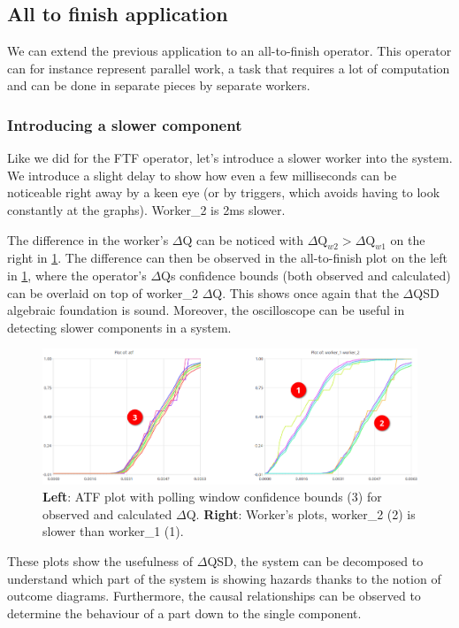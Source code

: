\subsection{All to finish application}
    We can extend the previous application to an all-to-finish operator. This operator can for instance represent parallel work, a task that requires a lot of computation and can be done in separate pieces by separate workers. \cite{dq-tut}

        \subsubsection{Introducing a slower component}
            Like we did for the FTF operator, let's introduce a slower worker into the system. We introduce a slight delay to show how even a few milliseconds can be noticeable right away by a keen eye (or by triggers, which avoids having to look constantly at the graphs). Worker\_2 is 2ms slower.
 
            The difference in the worker's $\Delta$Q can be noticed with $\Delta \text{Q}_{w2} > \Delta \text{Q}_{w1}$ on the right in \cref{fig:slower_atf}. The difference can then be observed in the all-to-finish plot on the left in \cref{fig:slower_atf}, where the operator's $\Delta$Qs confidence bounds (both observed and calculated) can be overlaid on top of worker\_2 $\Delta$Q. This shows once again that the $\Delta$QSD algebraic foundation is sound. Moreover, the oscilloscope can be useful in detecting slower components in a system.

            \begin{figure}[H]
                \begin{center}
                    \includegraphics[scale = 0.5]{img/overload_2/w1w2atfa.png}
                \end{center}
                \caption{\textbf{Left}: ATF plot with polling window confidence bounds (3) for observed and calculated $\Delta$Q. \textbf{Right}: Worker's plots, worker\_2 (2) is slower than worker\_1 (1).}
                \label{fig:slower_atf}
            \end{figure}

    These plots show the usefulness of $\Delta$QSD, the system can be decomposed to understand which part of the system is showing hazards thanks to the notion of outcome diagrams. Furthermore, the causal relationships can be observed to determine the behaviour of a part down to the single component.
